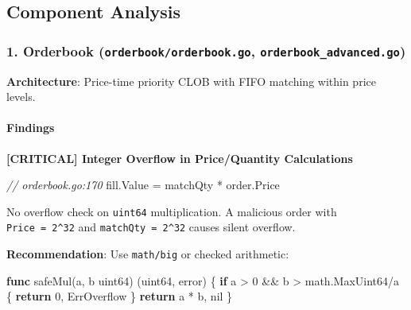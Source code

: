 \documentclass[
]{article}
\newenvironment{Shaded}{}{}
\newcommand{\CommentTok}[1]{\textcolor[rgb]{0.38,0.63,0.69}{\textit{#1}}}
\newcommand{\ControlFlowTok}[1]{\textcolor[rgb]{0.00,0.44,0.13}{\textbf{#1}}}
\newcommand{\DataTypeTok}[1]{\textcolor[rgb]{0.56,0.13,0.00}{#1}}
\newcommand{\DecValTok}[1]{\textcolor[rgb]{0.25,0.63,0.44}{#1}}
\newcommand{\KeywordTok}[1]{\textcolor[rgb]{0.00,0.44,0.13}{\textbf{#1}}}
\newcommand{\NormalTok}[1]{#1}
\newcommand{\OperatorTok}[1]{\textcolor[rgb]{0.40,0.40,0.40}{#1}}
\newcommand{\OtherTok}[1]{\textcolor[rgb]{0.00,0.44,0.13}{#1}}
\begin{document}
\subsection{Component Analysis}\label{component-analysis}

\subsubsection{\texorpdfstring{1. Orderbook
(\texttt{orderbook/orderbook.go},
\texttt{orderbook\_advanced.go})}{1. Orderbook (orderbook/orderbook.go, orderbook\_advanced.go)}}\label{1-orderbook-orderbookorderbookgo-orderbook_advancedgo}

\textbf{Architecture}: Price-time priority CLOB with FIFO matching
within price levels.

\paragraph{Findings}\label{findings}

\textbf{{[}CRITICAL{]} Integer Overflow in Price/Quantity Calculations}

\begin{Shaded}
\begin{Highlighting}[]
\CommentTok{// orderbook.go:170}
\NormalTok{fill}\OperatorTok{.}\NormalTok{Value }\OperatorTok{=}\NormalTok{ matchQty }\OperatorTok{*}\NormalTok{ order}\OperatorTok{.}\NormalTok{Price}
\end{Highlighting}
\end{Shaded}

No overflow check on \texttt{uint64} multiplication. A malicious order
with \texttt{Price\ =\ 2\^{}32} and \texttt{matchQty\ =\ 2\^{}32} causes
silent overflow.

\textbf{Recommendation}: Use \texttt{math/big} or checked arithmetic:

\begin{Shaded}
\begin{Highlighting}[]
\KeywordTok{func}\NormalTok{ safeMul}\OperatorTok{(}\NormalTok{a}\OperatorTok{,}\NormalTok{ b }\DataTypeTok{uint64}\OperatorTok{)} \OperatorTok{(}\DataTypeTok{uint64}\OperatorTok{,} \DataTypeTok{error}\OperatorTok{)} \OperatorTok{\{}
    \ControlFlowTok{if}\NormalTok{ a }\OperatorTok{\textgreater{}} \DecValTok{0} \OperatorTok{\&\&}\NormalTok{ b }\OperatorTok{\textgreater{}}\NormalTok{ math}\OperatorTok{.}\NormalTok{MaxUint64}\OperatorTok{/}\NormalTok{a }\OperatorTok{\{}
        \ControlFlowTok{return} \DecValTok{0}\OperatorTok{,}\NormalTok{ ErrOverflow}
    \OperatorTok{\}}
    \ControlFlowTok{return}\NormalTok{ a }\OperatorTok{*}\NormalTok{ b}\OperatorTok{,} \OtherTok{nil}
\OperatorTok{\}}
\end{Highlighting}
\end{Shaded}
\end{document}
